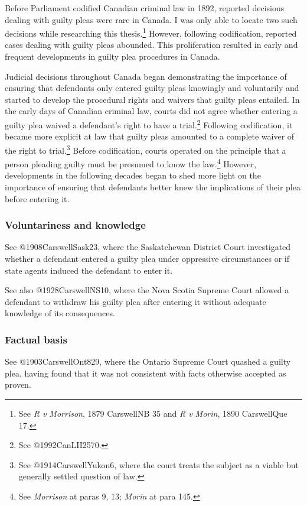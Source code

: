 Before Parliament codified Canadian criminal law in 1892, reported decisions dealing with guilty pleas were rare in Canada. I was only able to locate two such decisions while researching this thesis.\footnote{See \textit{R v Morrison}, 1879 CarswellNB 35 and \textit{R v Morin}, 1890 CarswellQue 17.} However, following codification, reported cases dealing with guilty pleas abounded. This proliferation resulted in early and frequent developments in guilty plea procedures in Canada.

Judicial decisions throughout Canada began demonstrating the importance of ensuring that defendants only entered guilty pleas knowingly and voluntarily and started to develop the procedural rights and waivers that guilty pleas entailed. In the early days of Canadian criminal law, courts did not agree whether entering a guilty plea waived a defendant's right to have a trial.\footnote{See @1992CanLII2570.} Following codification, it became more explicit at law that guilty pleas amounted to a complete waiver of the right to trial.\footnote{See @1914CarswellYukon6, where the court treats the subject as a viable but generally settled question of law.} Before codification, courts operated on the principle that a person pleading guilty must be presumed to know the law.\footnote{See \textit{Morrison} at paras 9, 13; \textit{Morin} at para 145.} However, developments in the following decades began to shed more light on the importance of ensuring that defendants better knew the implications of their plea before entering it.

\subsubsection{Voluntariness and knowledge}

See @1908CarswellSask23, where the Saskatchewan District Court investigated whether a defendant entered a guilty plea under oppressive circumstances or if state agents induced the defendant to enter it.

See also @1928CarswellNS10, where the Nova Scotia Supreme Court allowed a defendant to withdraw his guilty plea after entering it without adequate knowledge of its consequences.

\subsubsection{Factual basis}

See @1903CarswellOnt829, where the Ontario Supreme Court quashed a guilty plea, having found that it was not consistent with facts otherwise accepted as proven.

